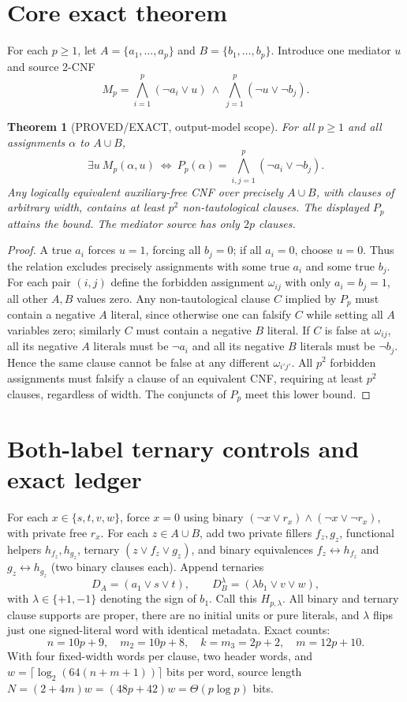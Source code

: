 \documentclass[11pt]{article}
\newtheorem{theorem}{Theorem}
\begin{document}
\section{Core exact theorem}
For each $p\ge1$, let $A=\{a_1,\ldots,a_p\}$ and $B=\{b_1,\ldots,b_p\}$. Introduce one mediator $u$ and source 2-CNF
\[
M_p=\bigwedge_{i=1}^p(\neg a_i\lor u)
\ \land\ \bigwedge_{j=1}^p(\neg u\lor\neg b_j).
\]
\begin{theorem}[PROVED/EXACT, output-model scope]
For all $p\ge1$ and all assignments $\alpha$ to $A\cup B$,
\[
\exists u\ M_p(\alpha,u)\ \iff\
P_p(\alpha)=\bigwedge_{i,j=1}^p(\neg a_i\lor\neg b_j).
\]
Any logically equivalent auxiliary-free CNF over precisely $A\cup B$, with clauses of arbitrary width, contains at least $p^2$ non-tautological clauses. The displayed $P_p$ attains the bound. The mediator source has only $2p$ clauses.
\end{theorem}
\begin{proof}
A true $a_i$ forces $u=1$, forcing all $b_j=0$; if all $a_i=0$, choose $u=0$. Thus the relation excludes precisely assignments with some true $a_i$ and some true $b_j$. For each pair $(i,j)$ define the forbidden assignment $\omega_{ij}$ with only $a_i=b_j=1$, all other $A,B$ values zero. Any non-tautological clause $C$ implied by $P_p$ must contain a negative $A$ literal, since otherwise one can falsify $C$ while setting all $A$ variables zero; similarly $C$ must contain a negative $B$ literal. If $C$ is false at $\omega_{ij}$, all its negative $A$ literals must be $\neg a_i$ and all its negative $B$ literals must be $\neg b_j$. Hence the same clause cannot be false at any different $\omega_{i'j'}$. All $p^2$ forbidden assignments must falsify a clause of an equivalent CNF, requiring at least $p^2$ clauses, regardless of width. The conjuncts of $P_p$ meet this lower bound.
\end{proof}

\section{Both-label ternary controls and exact ledger}
For each $x\in\{s,t,v,w\}$, force $x=0$ using binary $(\neg x\lor r_x)\land(\neg x\lor\neg r_x)$, with private free $r_x$. For each $z\in A\cup B$, add two private fillers $f_z,g_z$, functional helpers $h_{f_z},h_{g_z}$, ternary $(z\lor f_z\lor g_z)$, and binary equivalences $f_z\leftrightarrow h_{f_z}$ and $g_z\leftrightarrow h_{g_z}$ (two binary clauses each). Append ternaries
\[
D_A=(a_1\lor s\lor t),\qquad D_B^\lambda=(\lambda b_1\lor v\lor w),
\]
with $\lambda\in\{+1,-1\}$ denoting the sign of $b_1$. Call this $H_{p,\lambda}$. All binary and ternary clause supports are proper, there are no initial units or pure literals, and $\lambda$ flips just one signed-literal word with identical metadata. Exact counts:
\[
n=10p+9,\quad m_2=10p+8,\quad k=m_3=2p+2,\quad m=12p+10.
\]
With four fixed-width words per clause, two header words, and
$w=\lceil\log_2(64(n+m+1))\rceil$ bits per word, source length
$N=(2+4m)w=(48p+42)w=\Theta(p\log p)$ bits.
\end{document}
